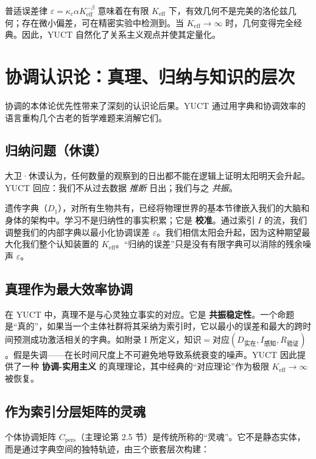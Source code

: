 \documentclass[12pt,a4paper]{article}
\newcommand{\Keff}{K_{\mathrm{eff}}}
\begin{document}
	普适误差律 \(\varepsilon = \kappa_c \alpha K_{\mathrm{eff}}^{-\beta}\) 意味着在有限 \(K_{\mathrm{eff}}\) 下，有效几何不是完美的洛伦兹几何；存在微小偏差，可在精密实验中检测到。当 \(K_{\mathrm{eff}} \to \infty\) 时，几何变得完全经典。因此，YUCT 自然化了关系主义观点并使其定量化。
	
	\section{协调认识论：真理、归纳与知识的层次}
	\label{sec:epistemology}
	
	协调的本体论优先性带来了深刻的认识论后果。YUCT 通过用字典和协调效率的语言重构几个古老的哲学难题来消解它们。
	
	\subsection{归纳问题（休谟）}
	
	大卫·休谟认为，任何数量的观察到的日出都不能在逻辑上证明太阳明天会升起。YUCT 回应：我们不从过去数据 \emph{推断} 日出；我们与之 \emph{共振}。
	
	遗传字典（\(D_1\)），对所有生物共有，已经将物理世界的基本节律嵌入我们的大脑和身体的架构中。学习不是归纳性的事实积累；它是 \textbf{校准}。通过索引 \(I\) 的流，我们调整我们的内部字典以最小化协调误差 \(\varepsilon\)。我们相信太阳会升起，因为这种期望最大化我们整个认知装置的 \(\Keff\)。“归纳的误差”只是没有有限字典可以消除的残余噪声 \(\varepsilon\)。
	
	\subsection{真理作为最大效率协调}
	
	在 YUCT 中，真理不是与心灵独立事实的对应。它是 \textbf{共振稳定性}。一个命题是“真的”，如果当一个主体社群将其采纳为索引时，它以最小的误差和最大的跨时间预测成功激活相关的字典。如附录 I 所定义，\(\text{知识} = \text{对应}(D_{\text{实在}}, I_{\text{感知}}, R_{\text{验证}})\)。假是失调——在长时间尺度上不可避免地导致系统衰变的噪声。YUCT 因此提供了一种 \textbf{协调-实用主义} 的真理理论，其中经典的“对应理论”作为极限 \(\Keff \to \infty\) 被恢复。
	
	\subsection{作为索引分层矩阵的灵魂}
	
	个体协调矩阵 \(C_{\mathrm{pers}}\)（主理论第 2.5 节）是传统所称的“灵魂”。它不是静态实体，而是通过字典空间的独特轨迹，由三个嵌套层次构建：
	
\end{document}

